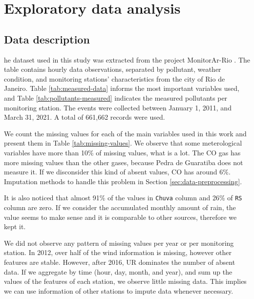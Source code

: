 \section{Exploratory data analysis}
\label{sec:eda}

\subsection{Data description}

he dataset used in this study was extracted from the project MonitorAr-Rio
\cite{dataset-rio-ar-quality}. The table contains hourly data observations, separated by
pollutant, weather condition, and monitoring stations' characteristics from
the city of Rio de Janeiro. Table
\ref{tab:measured-data} informs the most important variables used, and Table
\ref{tab:pollutants-measured} indicates the measured pollutants per monitoring
station. The events were collected between January 1,
2011,
and March 31, 2021. A total of 661,662 records were used.

We count the missing values for each of the main variables used in this work
and present them in Table \ref{tab:missing-values}. We observe that some
meterological variables have more than 10\% of missing values, what is a lot.
The CO gas has more missing values than the other gases, because Pedra de
Guaratiba does not measure it. If we disconsider this kind of absent values,
CO has around 6\%. Imputation methods to handle this problem in Section
\ref{sec:data-preprocessing}.

It is also noticed that almost 91\% of the values in {\tt Chuva} column and 26\%
of {\tt RS} column are zero. If we consider the accumulated monthly amount of
rain, the value seems to make sense and it is comparable to other sources,
therefore we kept it. 

We did not observe any pattern of missing values per year or per monitoring
station. In 2012, over half of the wind information is missing, however other
features are stable. However, after 2016, UR dominates the number of absent
data. If we aggregate by time (hour, day, month, and year), and sum up the
values of the features of each station, we observe little missing data. This
implies we can use information of other stations to impute data whenever
necessary. 

